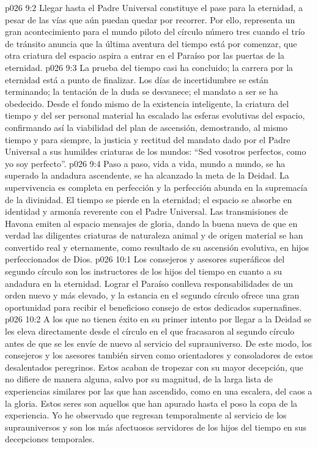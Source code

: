 \vs p026 9:2 Llegar hasta el Padre Universal constituye el pase para la eternidad, a pesar de las vías que aún puedan quedar por recorrer. Por ello, representa un gran acontecimiento para el mundo piloto del círculo número tres cuando el trío de tránsito anuncia que la última aventura del tiempo está por comenzar, que otra criatura del espacio aspira a entrar en el Paraíso por las puertas de la eternidad.
\vs p026 9:3 \pc La prueba del tiempo casi ha concluido; la carrera por la eternidad está a punto de finalizar. Los días de incertidumbre se están terminando; la tentación de la duda se desvanece; el mandato a ser  se ha obedecido. Desde el fondo mismo de la existencia inteligente, la criatura del tiempo y del ser personal material ha escalado las esferas evolutivas del espacio, confirmando así la viabilidad del plan de ascensión, demostrando, al mismo tiempo y para siempre, la justicia y rectitud del mandato dado por el Padre Universal a sus humildes criaturas de los mundos: “Sed vosotros perfectos, como yo soy perfecto”.
\vs p026 9:4 Paso a paso, vida a vida, mundo a mundo, se ha superado la andadura ascendente, se ha alcanzado la meta de la Deidad. La supervivencia es completa en perfección y la perfección abunda en la supremacía de la divinidad. El tiempo se pierde en la eternidad; el espacio se absorbe en identidad y armonía reverente con el Padre Universal. Las transmisiones de Havona emiten al espacio mensajes de gloria, dando la buena nueva de que en verdad las diligentes criaturas de naturaleza animal y de origen material se han convertido real y eternamente, como resultado de su ascensión evolutiva, en hijos perfeccionados de Dios.
\vs p026 10:1 Los consejeros y asesores superáficos del segundo círculo son los instructores de los hijos del tiempo en cuanto a su andadura en la eternidad. Lograr el Paraíso conlleva responsabilidades de un orden nuevo y más elevado, y la estancia en el segundo círculo ofrece una gran oportunidad para recibir el beneficioso consejo de estos dedicados supernafines.
\vs p026 10:2 \pc A los que no tienen éxito en su primer intento por llegar a la Deidad se les eleva directamente desde el círculo en el que fracasaron al segundo círculo antes de que se les envíe de nuevo al servicio del suprauniverso. De este modo, los consejeros y los asesores también sirven como orientadores y consoladores de estos desalentados peregrinos. Estos acaban de tropezar con su mayor decepción, que no difiere de manera alguna, salvo por su magnitud, de la larga lista de experiencias similares por las que han ascendido, como en una escalera, del caos a la gloria. Estos seres son aquellos que han apurado hasta el poso la copa de la experiencia. Yo he observado que regresan temporalmente al servicio de los suprauniversos y son los más afectuosos servidores de los hijos del tiempo en sus decepciones temporales.
